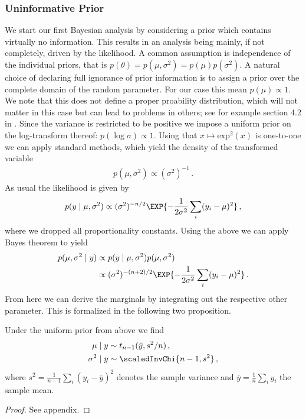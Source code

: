 \subsubsection*{Uninformative Prior}
We start our first Bayesian analysis by considering a prior which contains virtually no information.
This results in an analysis being mainly, if not completely, driven by the likelihood.
A common assumption is independence of the individual priors, that is $p(\theta) = p(\mu, \sigma^2) = p(\mu) p(\sigma^2)$.
A natural choice of declaring full ignorance of prior information is to assign a prior over the complete domain of the random parameter. For our case this mean $p(\mu) \propto 1$.
We note that this does not define a proper proability distribution, which will not matter in this case but can lead to problems in others; see for example section 4.2 in \citet{kass1996}.
Since the variance is restricted to be positive we impose a uniform prior on the log-transform thereof: $p(\log \sigma) \propto 1$.
Using that $x \mapsto \text{exp}^2(x)$ is one-to-one we can apply standard methods, which yield the density of the transformed variable
\begin{align}
  p(\mu, \sigma^2) \propto (\sigma^2)^{-1} \,.
\end{align}
As usual the likelihood is given by
\begin{align}
  p(y \mid \mu, \sigma^2) \propto (\sigma^2)^{-n/2} \EXP{-\frac{1}{2\sigma^2}\sum_i (y_i - \mu)^2} \,,
\end{align}
where we dropped all proportionality constants.
Using the above we can apply Bayes theorem to yield
\begin{align}
  p(\mu, \sigma^2 \mid y) &\propto p(y \mid \mu, \sigma^2) p(\mu, \sigma^2)\\
  &\propto (\sigma^2)^{-(n+2)/2} \EXP{-\frac{1}{2\sigma^2}\sum_i (y_i - \mu)^2} \,.
\end{align}
From here we can derive the marginals by integrating out the respective other parameter. This is formalized in the following two proposition.

\begin{proposition}
  Under the uniform prior from above we find
  \begin{align}
    \mu \mid y &\sim t_{n-1}(\bar{y}, s^2/n) \,,\\
    \sigma^2 \mid y &\sim \scaledInvChi{n-1, s^2} \,,
  \end{align}
  where $s^2 = \frac{1}{n-1} \sum_i (y_i - \bar{y})^2$ denotes the sample variance and $\bar{y} = \frac{1}{n} \sum_i y_i$ the sample mean.
\end{proposition}
\begin{proof}
See appendix.
\end{proof}

